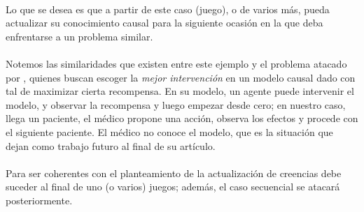 \documentclass[11pt]{article}
\theoremstyle{plain}
\begin{document}
\\
Lo que se desea es que a partir de este caso (juego), o de varios más, pueda actualizar su conocimiento causal para la siguiente ocasión en la que deba enfrentarse a  un problema similar.\\
\\
Notemos las similaridades que existen entre este ejemplo y el problema atacado por \cite{lattimoreNIPS2016}, quienes buscan escoger la \textit{mejor intervención} en un modelo causal dado con tal de maximizar cierta recompensa. En su modelo, un agente puede intervenir el modelo, y observar la recompensa y luego empezar desde cero; en nuestro caso, llega un paciente, el médico propone una acción, observa los efectos y procede con el siguiente paciente. El médico no conoce el modelo, que es la situación que \cite{lattimoreNIPS2016} dejan como trabajo futuro al final de su artículo. \\
\\
Para ser coherentes con el planteamiento de \cite{lattimoreNIPS2016} la actualización de creencias debe suceder al final de uno (o varios) juegos; además, el caso secuencial se atacará posteriormente.\\
\\
\end{document}
